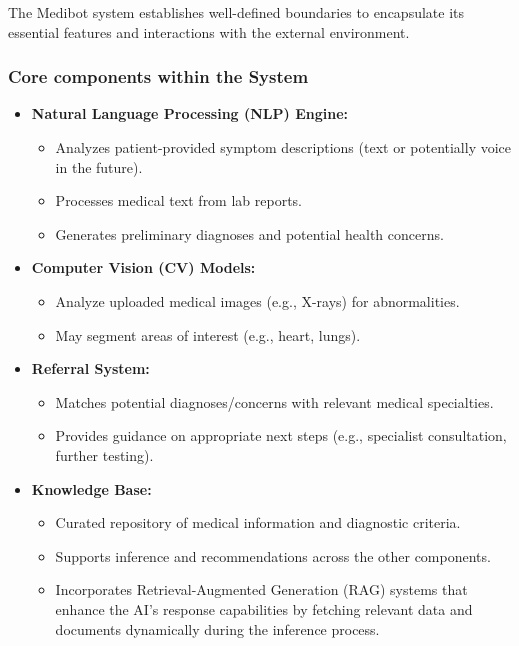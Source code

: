 The Medibot system establishes well-defined boundaries to encapsulate its essential features and interactions with the external environment.
\subsubsection{Core components within the System}

\begin{itemize}
\item \textbf{Natural Language Processing (NLP) Engine:}
    \begin{itemize}
        \item Analyzes patient-provided symptom descriptions (text or potentially voice in the future).
        \item Processes medical text from lab reports.
        \item Generates preliminary diagnoses and potential health concerns.
    \end{itemize}

\item \textbf{Computer Vision (CV) Models:}
    \begin{itemize}
        \item Analyze uploaded medical images (e.g., X-rays) for abnormalities.
        \item May segment areas of interest (e.g., heart, lungs). 
    \end{itemize}

\item \textbf{Referral System:}
    \begin{itemize}  
       \item Matches potential diagnoses/concerns with relevant medical specialties.
       \item Provides guidance on appropriate next steps (e.g., specialist consultation, further testing).
    \end{itemize}    

\item \textbf{Knowledge Base:}
    \begin{itemize}
        \item Curated repository of medical information and diagnostic criteria.
        \item Supports inference and recommendations across the other components.
        \item Incorporates Retrieval-Augmented Generation (RAG) systems that enhance the AI's response capabilities by fetching relevant data and documents dynamically during the inference process.

    \end{itemize}

\end{itemize} %

